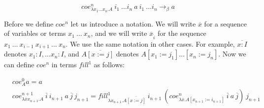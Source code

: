 \documentclass{amsart}
\theoremstyle{definition}
\theoremstyle{remark}
\numberwithin{figure}{section}
\begin{document}
\[ coe^n_{\lambda x_1 \ldots x_n. A}\ i_1\ \ldots i_n\ a\ i_1\ \ldots i_n \to_\beta a \]

Before we define $coe^n$ let us introduce a notation.
We will write $\overline{x}$ for a sequence of variables or terms $x_1\ \ldots\ x_n$,
    and we will write $\overline{x}_{\hat{i}}$ for the sequence $x_1\ \ldots\ x_{i - 1}\ x_{i + 1}\ \ldots\ x_n$.
We use the same notation in other cases.
For example, $\overline{x : I}$ denotes $x_1 : I, \ldots x_n : I$, and $A \overline{[x := j]}$ denotes $A[x_1 := j_1] \ldots [x_n := j_n]$.
Now we can define $coe^n$ in terms $fill^1$ as follows:

\begin{align*}
& coe^0_A a = a \\
& coe^{n+1}_{\lambda \overline{x} x_{n+1}. A}\ \overline{i}\ i_{n+1}\ a\ \overline{j}\ j_{n+1} = fill^1_{\lambda x_{n+1}. A \overline{[x := j]}}\ i_{n+1}\ (coe^n_{\lambda \overline{x}. A[x_{n+1} := i_{n+1}]}\ \overline{i}\ a\ \overline{j})\ j_{n+1}
\end{align*}
\end{document}

